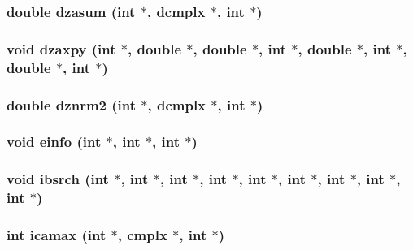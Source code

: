 \subsubsection{\setlength{\rightskip}{0pt plus 5cm}double dzasum (int $\ast$, {\bf dcmplx} $\ast$, int $\ast$)}\label{essl_8h_6bedc317d23d6f3b23dd9599068f47f0}


\subsubsection{\setlength{\rightskip}{0pt plus 5cm}void dzaxpy (int $\ast$, double $\ast$, double $\ast$, int $\ast$, double $\ast$, int $\ast$, double $\ast$, int $\ast$)}\label{essl_8h_4905d083f609cd1281462edb70f70294}


\subsubsection{\setlength{\rightskip}{0pt plus 5cm}double dznrm2 (int $\ast$, {\bf dcmplx} $\ast$, int $\ast$)}\label{essl_8h_9ee1712710cfd9131d1d07ccebb16aa2}


\subsubsection{\setlength{\rightskip}{0pt plus 5cm}void einfo (int $\ast$, int $\ast$, int $\ast$)}\label{essl_8h_02483d0a28160060d0cff2a55a3116f5}


\subsubsection{\setlength{\rightskip}{0pt plus 5cm}void ibsrch (int $\ast$, int $\ast$, int $\ast$, int $\ast$, int $\ast$, int $\ast$, int $\ast$, int $\ast$, int $\ast$)}\label{essl_8h_1c1e7795802fa33c85c6a3e1eadb4aad}


\subsubsection{\setlength{\rightskip}{0pt plus 5cm}int icamax (int $\ast$, {\bf cmplx} $\ast$, int $\ast$)}\label{essl_8h_c774f572fef40189502100daf0345de6}



